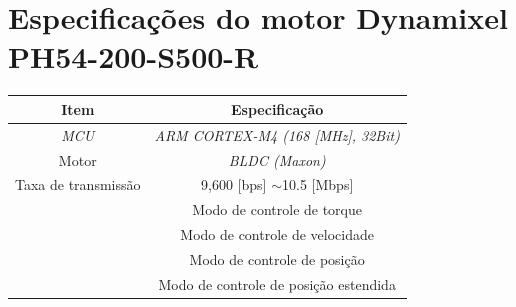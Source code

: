 \documentclass[
12pt,					%
openright,				%
twoside,				%
a4paper,				%
english,
brazil
]{ABNT/abntex2_report}
\begin{document}
	




	\chapter{Especificações do motor Dynamixel PH54-200-S500-R}
	\label{ann:esp_motors_ph54_200}
	
	\begin{table}[H]
		\begin{adjustbox}{max width=\textwidth}
		\begin{tabular}{|c|c|}
		\hline
		\rowcolor[HTML]{EFEFEF} 
		{\color[HTML]{333333} \textbf{Item}}                                               & {\color[HTML]{000000} \textbf{Especificação}}                                         \\ \hline
		\rowcolor[HTML]{FFFFFF} 
		{\color[HTML]{000000} \textit{MCU}}                                                & {\color[HTML]{000000} \textit{ARM CORTEX-M4 (168 {[}MHz{]}, 32Bit)}}                   \\ \hline
		\rowcolor[HTML]{EFEFEF} 
		{\color[HTML]{000000} Motor}                                                       & {\color[HTML]{000000} \textit{BLDC (Maxon)}}                                           \\ \hline
		\rowcolor[HTML]{FFFFFF} 
		{\color[HTML]{000000} Taxa de transmissão}                                         & {\color[HTML]{000000} 9,600 {[}bps{]} $\sim$10.5 {[}Mbps{]}}                           \\ \hline
		\rowcolor[HTML]{EFEFEF} 
		\cellcolor[HTML]{EFEFEF}{\color[HTML]{000000} }                                    & {\color[HTML]{000000} Modo de controle de torque}                                      \\ \cline{2-2} 
		\rowcolor[HTML]{EFEFEF} 
		\cellcolor[HTML]{EFEFEF}{\color[HTML]{000000} }                                    & {\color[HTML]{000000} Modo de controle de velocidade}                                  \\ \cline{2-2} 
		\rowcolor[HTML]{EFEFEF} 
		\cellcolor[HTML]{EFEFEF}{\color[HTML]{000000} }                                    & {\color[HTML]{000000} Modo de controle de posição}                                     \\ \cline{2-2} 
		\rowcolor[HTML]{EFEFEF} 
		\cellcolor[HTML]{EFEFEF}{\color[HTML]{000000} }                                    & {\color[HTML]{000000} Modo de controle de posição estendida}                           \\ \cline{2-2} 

\end{tabular}
\end{adjustbox}
\end{table}
\end{document}
